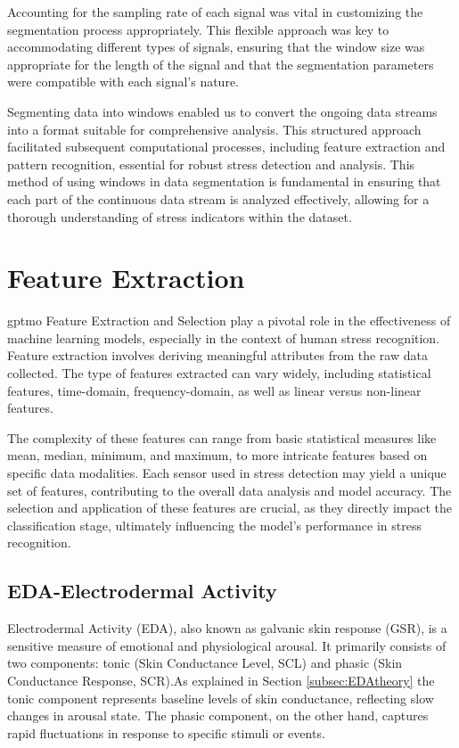 Accounting for the sampling rate of each signal was vital in customizing the segmentation process appropriately. This flexible approach was key to accommodating different types of signals, ensuring that the window size was appropriate for the length of the signal and that the segmentation parameters were compatible with each signal's nature.

Segmenting data into windows enabled us to convert the ongoing data streams into a format suitable for comprehensive analysis. This structured approach facilitated subsequent computational processes, including feature extraction and pattern recognition, essential for robust stress detection and analysis. This method of using windows in data segmentation is fundamental in ensuring that each part of the continuous data stream is analyzed effectively, allowing for a thorough understanding of stress indicators within the dataset.

\section{Feature Extraction} \gls*{gptmo}
Feature Extraction and Selection play a pivotal role in the effectiveness of machine learning models, especially in the context of human stress recognition. Feature extraction involves deriving meaningful attributes from the raw data collected. The type of features extracted can vary widely, including statistical features, time-domain, frequency-domain, as well as linear versus non-linear features.

The complexity of these features can range from basic statistical measures like mean, median, minimum, and maximum, to more intricate features based on specific data modalities. Each sensor used in stress detection may yield a unique set of features, contributing to the overall data analysis and model accuracy. The selection and application of these features are crucial, as they directly impact the classification stage, ultimately influencing the model's performance in stress recognition.

\subsection{EDA-Electrodermal Activity}

Electrodermal Activity (EDA), also known as galvanic skin response (GSR), is a sensitive measure of emotional and physiological arousal. It primarily consists of two components: tonic (Skin Conductance Level, SCL) and phasic (Skin Conductance Response, SCR).As explained in Section \ref*{subsec:EDAtheory} the tonic component represents baseline levels of skin conductance, reflecting slow changes in arousal state. The phasic component, on the other hand, captures rapid fluctuations in response to specific stimuli or events.


